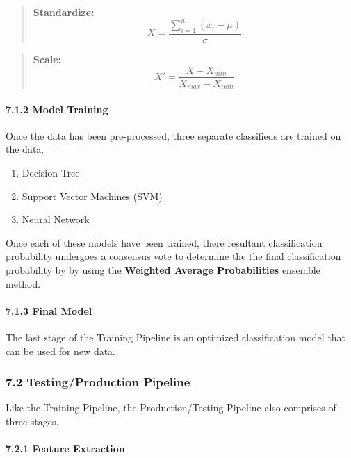 \documentclass{scrreprt}
\begin{document}
\begin{quote}
\textbf{Standardize:} \[
X = \frac{\sum^{n}_{i=1}(x_{i} - \mu)}{\sigma}
\]
\end{quote}

\begin{quote}
\textbf{Scale:} \[
X' = \frac{X - X_{min}}{X_{max} - X_{min}}
\]
\end{quote}

\paragraph{7.1.2 Model Training}\label{model-training}

Once the data has been pre-processed, three separate classifieds are
trained on the data.

\begin{enumerate}
\def\labelenumi{\arabic{enumi}.}
\itemsep1pt\parskip0pt
\item
  Decision Tree
\item
  Support Vector Machines (SVM)
\item
  Neural Network
\end{enumerate}

Once each of these models have been trained, there resultant
classification probability undergoes a consensus vote to determine the
the final classification probability by by using the \textbf{Weighted
Average Probabilities} ensemble method.

\paragraph{7.1.3 Final Model}\label{final-model}

The last stage of the Training Pipeline is an optimized classification
model that can be used for new data.

\subsubsection{7.2 Testing/Production
Pipeline}\label{testingproduction-pipeline}

Like the Training Pipeline, the Production/Testing Pipeline also
comprises of three stages.

\paragraph{7.2.1 Feature Extraction}\label{feature-extraction-1}
\end{document}
